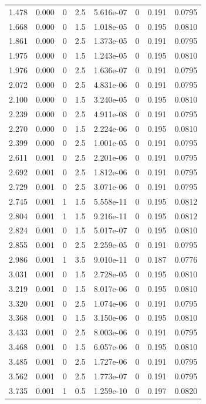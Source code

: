 \documentclass[preview]{standalone}
\begin{document}
{{\begin{tabular}{L{1.2cm}C{1.2cm} C{0.3cm}C{0.5cm} C{1.4cm}C{1.4cm} C{1.4cm}C{1.4cm}}
  1.478  &  0.000  & 0     & 2.5 &  5.616e-07  & 0  & 0.191 &  0.0795   \\ 
  1.668  &  0.000  & 0     & 1.5 &  1.018e-05  & 0  & 0.195 &  0.0810   \\ 
  1.861  &  0.000  & 0     & 2.5 &  1.373e-05  & 0  & 0.191 &  0.0795   \\ 
  1.975  &  0.000  & 0     & 1.5 &  1.243e-05  & 0  & 0.195 &  0.0810   \\ 
  1.976  &  0.000  & 0     & 2.5 &  1.636e-07  & 0  & 0.191 &  0.0795   \\ 
  2.072  &  0.000  & 0     & 2.5 &  4.831e-06  & 0  & 0.191 &  0.0795   \\ 
  2.100  &  0.000  & 0     & 1.5 &  3.240e-05  & 0  & 0.195 &  0.0810   \\ 
  2.239  &  0.000  & 0     & 2.5 &  4.911e-08  & 0  & 0.191 &  0.0795   \\ 
  2.270  &  0.000  & 0     & 1.5 &  2.224e-06  & 0  & 0.195 &  0.0810   \\ 
  2.399  &  0.000  & 0     & 2.5 &  1.001e-05  & 0  & 0.191 &  0.0795   \\ 
  2.611  &  0.001  & 0     & 2.5 &  2.201e-06  & 0  & 0.191 &  0.0795   \\ 
  2.692  &  0.001  & 0     & 2.5 &  1.812e-06  & 0  & 0.191 &  0.0795   \\ 
  2.729  &  0.001  & 0     & 2.5 &  3.071e-06  & 0  & 0.191 &  0.0795   \\ 
  2.745  &  0.001  & 1     & 1.5 &  5.558e-11  & 0  & 0.195 &  0.0812   \\ 
  2.804  &  0.001  & 1     & 1.5 &  9.216e-11  & 0  & 0.195 &  0.0812   \\ 
  2.824  &  0.001  & 0     & 1.5 &  5.017e-07  & 0  & 0.195 &  0.0810   \\ 
  2.855  &  0.001  & 0     & 2.5 &  2.259e-05  & 0  & 0.191 &  0.0795   \\ 
  2.986  &  0.001  & 1     & 3.5 &  9.010e-11  & 0  & 0.187 &  0.0776   \\ 
  3.031  &  0.001  & 0     & 1.5 &  2.728e-05  & 0  & 0.195 &  0.0810   \\ 
  3.219  &  0.001  & 0     & 1.5 &  8.017e-06  & 0  & 0.195 &  0.0810   \\ 
  3.320  &  0.001  & 0     & 2.5 &  1.074e-06  & 0  & 0.191 &  0.0795   \\ 
  3.368  &  0.001  & 0     & 1.5 &  3.150e-06  & 0  & 0.195 &  0.0810   \\ 
  3.433  &  0.001  & 0     & 2.5 &  8.003e-06  & 0  & 0.191 &  0.0795   \\ 
  3.468  &  0.001  & 0     & 1.5 &  6.057e-06  & 0  & 0.195 &  0.0810   \\ 
  3.485  &  0.001  & 0     & 2.5 &  1.727e-06  & 0  & 0.191 &  0.0795   \\ 
  3.562  &  0.001  & 0     & 2.5 &  1.773e-07  & 0  & 0.191 &  0.0795   \\ 
  3.735  &  0.001  & 1     & 0.5 &  1.259e-10  & 0  & 0.197 &  0.0820   \\ 
\hline 
\end{tabular} 

}}
\end{document}
